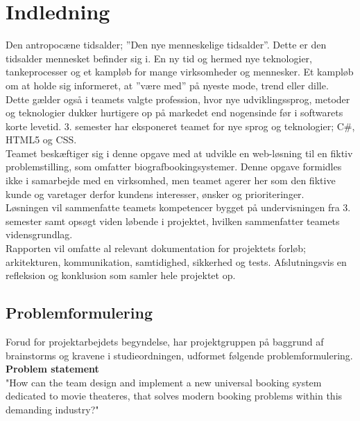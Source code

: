 \chapter{Indledning}\label{ch:indledning}
Den antropocæne tidsalder; ”Den nye menneskelige tidsalder”. Dette er den tidsalder mennesket befinder sig i.
En ny tid og hermed nye teknologier, tankeprocesser og et kampløb for mange virksomheder og mennesker. 
Et kampløb om at holde sig informeret, at ”være med” på nyeste mode, trend eller dille. \\

Dette gælder også i teamets valgte profession, hvor nye udviklingssprog, metoder og teknologier dukker 
hurtigere op på markedet end nogensinde før i softwarets korte levetid. 3. semester har eksponeret teamet for nye sprog og teknologier; 
C\#, HTML5 og CSS. \\

Teamet beskæftiger sig i denne opgave med at udvikle en web-løsning til en fiktiv problemstilling,
som omfatter biografbookingsystemer. Denne opgave formidles ikke i samarbejde med en virksomhed, 
men teamet agerer her som den fiktive kunde og varetager derfor kundens interesser, ønsker og prioriteringer. \\

Løsningen vil sammenfatte teamets kompetencer bygget på undervisningen fra 3. semester samt opsøgt viden løbende i 
projektet, hvilken sammenfatter teamets vidensgrundlag. \\

Rapporten vil omfatte al relevant dokumentation for projektets forløb; arkitekturen, 
kommunikation, samtidighed, sikkerhed og tests. Afslutningsvis en refleksion og konklusion som samler hele projektet op.

\newpage
\section{Problemformulering}\label{sec:problemformulering}
Forud for projektarbejdets begyndelse, har projektgruppen på baggrund af brainstorms og kravene i
studieordningen, udformet følgende problemformulering. \\

\textbf{Problem statement} \\
"How can the team design and implement a new universal booking system dedicated to movie theateres, 
that solves modern booking problems within this demanding industry?" \\

